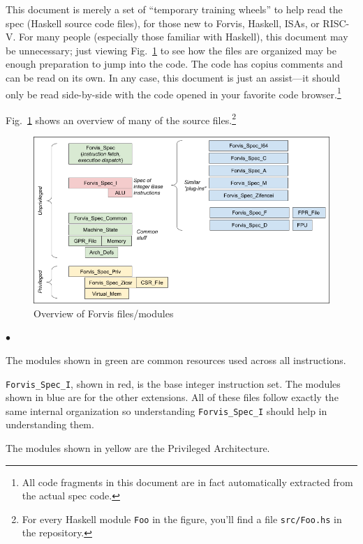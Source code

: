 \documentclass[11pt]{article}
\newenvironment{tightlist}%
{\begin{list}{$\bullet$}{%
    \setlength{\topsep}{0in}
    \setlength{\partopsep}{0in}
    \setlength{\itemsep}{0in}
    \setlength{\parsep}{0in}
    \setlength{\leftmargin}{1.5em}
    \setlength{\rightmargin}{0in}
    \setlength{\itemindent}{0in}
}
}%
{\end{list}
}
\begin{document}
This document is merely a set of ``temporary training wheels'' to help
read the spec (Haskell source code files), for those new to Forvis,
Haskell, ISAs, or RISC-V.  For many people (especially those familiar
with Haskell), this document may be unnecessary; just viewing
Fig.~\ref{Fig_Overview} to see how the files are organized may be
enough preparation to jump into the code.  The code has copius
comments and can be read on its own.  In any case, this document is
just an assist---it should only be read side-by-side with the code
opened in your favorite code browser.\footnote{ All code fragments in
this document are in fact automatically extracted from the actual spec
code.}

Fig.~\ref{Fig_Overview} shows an overview of many of the source
files.\footnote{For every Haskell module {\tt Foo} in the figure,
you'll find a file {\tt src/Foo.hs} in the repository.}

\begin{figure}[htbp]
    \centering
    \includegraphics[width=6in]{Figs/Fig_Overview}
    \caption{\label{Fig_Overview}
                    Overview of Forvis files/modules}
\end{figure}

\begin{tightlist}

\item The modules shown in green are common resources used across all instructions.

\item \verb|Forvis_Spec_I|, shown in red, is the base integer
instruction set.  The modules shown in blue are for the other
extensions. All of these files follow exactly the same internal
organization so understanding \verb|Forvis_Spec_I| should help in
understanding them.

\item The modules shown in yellow are the Privileged Architecture.

\end{tightlist}
\end{document}
